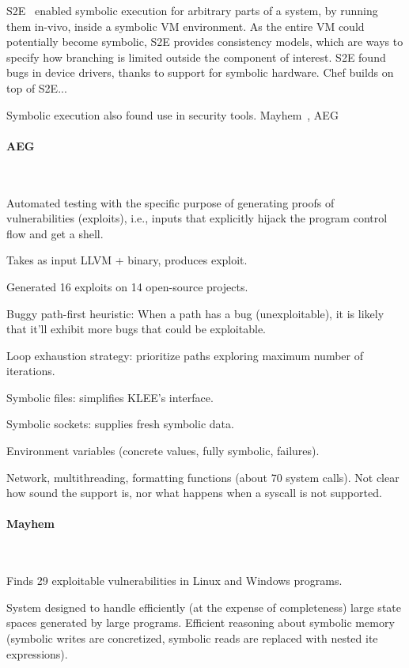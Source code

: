 S2E~\cite{s2eSystem} enabled symbolic execution for arbitrary parts of a system, by running them in-vivo, inside a symbolic VM environment.  As the entire VM could potentially become symbolic, S2E provides consistency models, which are ways to specify how branching is limited outside the component of interest.  S2E found bugs in device drivers, thanks to support for symbolic hardware.
%
Chef builds on top of S2E...

Symbolic execution also found use in security tools.  Mayhem~\cite{mayhem}, AEG~\cite{aeg}

\paragraph{AEG}~\cite{aeg}

Automated testing with the specific purpose of generating proofs of vulnerabilities (exploits), i.e., inputs that explicitly hijack the program control flow and get a shell.

Takes as input LLVM + binary, produces exploit.

Generated 16 exploits on 14 open-source projects.

Buggy path-first heuristic: When a path has a bug (unexploitable), it is likely that it'll exhibit more bugs that could be exploitable.

Loop exhaustion strategy: prioritize paths exploring maximum number of iterations.

Symbolic files: simplifies KLEE's interface.

Symbolic sockets: supplies fresh symbolic data.

Environment variables (concrete values, fully symbolic, failures).

Network, multithreading, formatting functions (about 70 system calls).  Not clear how sound the support is, nor what happens when a syscall is not supported.

\paragraph{Mayhem}~\cite{mayhem}

Finds 29 exploitable vulnerabilities in Linux and Windows programs.

System designed to handle efficiently (at the expense of completeness) large state spaces generated by large programs.  Efficient reasoning about symbolic memory (symbolic writes are concretized, symbolic reads are replaced with nested ite expressions).

